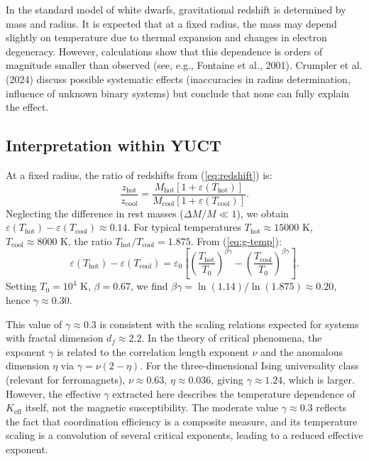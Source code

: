 \documentclass[12pt]{article}
\theoremstyle{remark}
\newcommand{\Keff}{K_{\mathrm{eff}}}
\newcommand{\eps}{\varepsilon}
\newcommand{\df}{d_{\!f}}
\begin{document}
	In the standard model of white dwarfs, gravitational redshift is determined by mass and radius. It is expected that at a fixed radius, the mass may depend slightly on temperature due to thermal expansion and changes in electron degeneracy. However, calculations show that this dependence is orders of magnitude smaller than observed (see, e.g., Fontaine et al., 2001). Crumpler et al. (2024) discuss possible systematic effects (inaccuracies in radius determination, influence of unknown binary systems) but conclude that none can fully explain the effect.
	
	\subsection{Interpretation within YUCT}
	\label{subsec:wd-yuct}
	
	At a fixed radius, the ratio of redshifts from (\ref{eq:redshift}) is:
	\begin{equation}
		\frac{z_{\text{hot}}}{z_{\text{cool}}} = \frac{M_{\text{hot}}[1+\eps(T_{\text{hot}})]}{M_{\text{cool}}[1+\eps(T_{\text{cool}})]}.
		\label{eq:redshift-ratio}
	\end{equation}
	Neglecting the difference in rest masses ($\Delta M/M \ll 1$), we obtain $\eps(T_{\text{hot}}) - \eps(T_{\text{cool}}) \approx 0.14$. For typical temperatures $T_{\text{hot}} \approx 15000$ K, $T_{\text{cool}} \approx 8000$ K, the ratio $T_{\text{hot}}/T_{\text{cool}} = 1.875$. From (\ref{eq:g-temp}):
	\begin{equation}
		\eps(T_{\text{hot}}) - \eps(T_{\text{cool}}) = \eps_0 \left[ \left( \frac{T_{\text{hot}}}{T_0} \right)^{\beta\gamma} - \left( \frac{T_{\text{cool}}}{T_0} \right)^{\beta\gamma} \right].
		\label{eq:eps-diff}
	\end{equation}
	Setting $T_0 = 10^4$ K, $\beta = 0.67$, we find $\beta\gamma = \ln(1.14) / \ln(1.875) \approx 0.20$, hence $\gamma \approx 0.30$. 
	
	This value of $\gamma \approx 0.3$ is consistent with the scaling relations expected for systems with fractal dimension $\df \approx 2.2$. In the theory of critical phenomena, the exponent $\gamma$ is related to the correlation length exponent $\nu$ and the anomalous dimension $\eta$ via $\gamma = \nu(2-\eta)$. For the three-dimensional Ising universality class (relevant for ferromagnets), $\nu \approx 0.63$, $\eta \approx 0.036$, giving $\gamma \approx 1.24$, which is larger. However, the effective $\gamma$ extracted here describes the temperature dependence of $\Keff$ itself, not the magnetic susceptibility. The moderate value $\gamma \approx 0.3$ reflects the fact that coordination efficiency is a composite measure, and its temperature scaling is a convolution of several critical exponents, leading to a reduced effective exponent.
	
\end{document}
